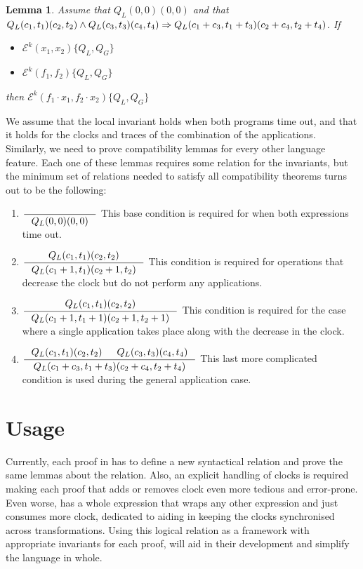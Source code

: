 \newtheorem{theorem}{Theorem}[section]
\newtheorem{corollary}{Corollary}[theorem]
\newtheorem{lemma}[theorem]{Lemma}

\begin{lemma}
  Assume that $Q_L(0,0)(0,0)$ and that
  $Q_L(c_1,t_1)(c_2,t_2)\land Q_L(c_3,t_3)(c_4,t_4)\\
   \Rightarrow Q_L(c_1 + c_3,t_1 + t_3)(c_2 + c_4,t_2 + t_4)$.
  If
  \begin{itemize}
    \item $\mathcal{E}^k(x_1, x_2)\{Q_L,Q_G\}$
    \item $\mathcal{E}^k(f_1, f_2)\{Q_L,Q_G\}$
  \end{itemize}
  then $\mathcal{E}^k(f_1 \cdot x_1, f_2 \cdot x_2)\{Q_L,Q_G\}$
\end{lemma}

We assume that the local invariant holds when both programs time out, and that
it holds for the clocks and traces of the combination of the applications.
Similarly, we need to prove compatibility lemmas for every other language
feature. Each one of these lemmas requires some relation for the invariants, but
the minimum set of relations needed to satisfy all compatibility theorems turns
out to be the following:

\begin{enumerate}

\item $\inference{}{Q_L(0,0)(0,0)}$
  This base condition is required for when both expressions time out.
\item $\inference{Q_L(c_1,t_1)(c_2,t_2)}{Q_L(c_1+1,t_1)(c_2+1,t_2)}$ This
  condition is required for operations that decrease the clock but do not
  perform any applications.
\item $\inference{Q_L(c_1,t_1)(c_2,t_2)}{Q_L(c_1+1,t_1+1)(c_2+1,t_2+1)}$ This
  condition is required for the case where a single application takes place
  along with the decrease in the clock.
\item $\inference{Q_L(c_1,t_1)(c_2,t_2)& Q_L(c_3,t_3)(c_4,t_4)}
                 {Q_L(c_1+c_3,t_1+t_3)(c_2+c_4,t_2+t_4)}$ This last more
  complicated condition is used during the general application case.
\end{enumerate}

\section{Usage}

Currently, each proof in \ThunkLang{} has to define a new syntactical relation
and prove the same lemmas about the relation. Also, an explicit handling of
clocks is required making each proof that adds or removes clock even more
tedious and error-prone. Even worse, \ThunkLang{} has a whole 
expression that wraps any other expression and just consumes more clock,
dedicated to aiding in keeping the clocks synchronised across transformations.
Using this logical relation as a framework with appropriate invariants for each
proof, will aid in their development and simplify the language in whole.

